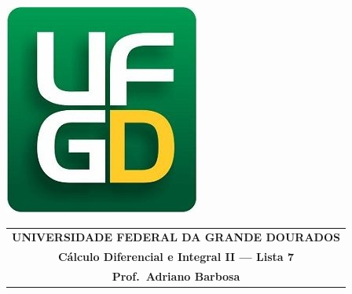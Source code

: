 \documentclass[a4paper,5pt]{amsbook}
\begin{document}
\thispagestyle{empty}
\pagestyle{empty}
\begin{minipage}[h]{0.14\textwidth}
	\includegraphics[scale=0.24]{../../ufgd.png}
\end{minipage}
\begin{minipage}[h]{\textwidth}
\begin{tabular}{c}
{{\bf UNIVERSIDADE FEDERAL DA GRANDE DOURADOS}}\\
{{\bf C\'{a}lculo Diferencial e Integral II --- Lista 7}}\\
{{\bf Prof.\ Adriano Barbosa}}\\
\end{tabular}
\vspace{-0.45cm}
%
\end{minipage}

\end{document}
